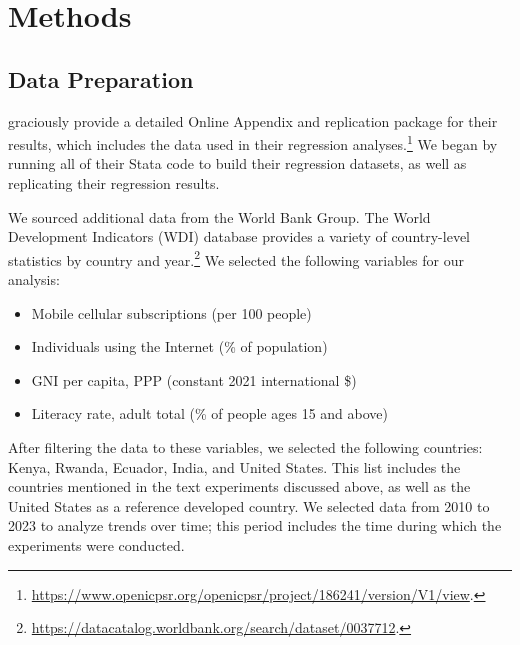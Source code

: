 \documentclass[12pt]{article}
\begin{document}
\section{Methods}
\label{section:methods}

\subsection{Data Preparation}
\textcite{fabregas_digital_2025} graciously provide a detailed Online Appendix and replication package for their results, which includes the data used in their regression analyses.\footnote{\url{https://www.openicpsr.org/openicpsr/project/186241/version/V1/view}.} We began by running all of their Stata code to build their regression datasets, as well as replicating their regression results.

We sourced additional data from the World Bank Group. The World Development Indicators (WDI) database provides a variety of country-level statistics by country and year.\footnote{\url{https://datacatalog.worldbank.org/search/dataset/0037712}.} We selected the following variables for our analysis:
\begin{itemize}
    \singlespacing
    \item Mobile cellular subscriptions (per 100 people)
    \item Individuals using the Internet (\% of population)
    \item GNI per capita, PPP (constant 2021 international \$)
    \item Literacy rate, adult total (\% of people ages 15 and above)
\end{itemize}
After filtering the data to these variables, we selected the following countries: Kenya, Rwanda, Ecuador, India, and United States. This list includes the countries mentioned in the text experiments discussed above, as well as the United States as a reference developed country. We selected data from 2010 to 2023 to analyze trends over time; this period includes the time during which the \textcite{fabregas_digital_2025} experiments were conducted.
\end{document}

